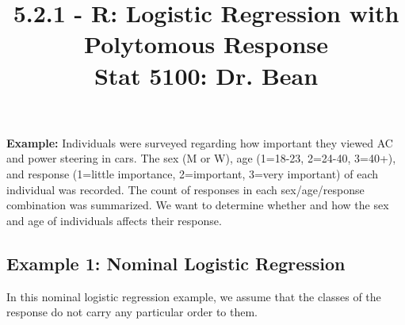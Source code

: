 \documentclass{article}\usepackage[]{graphicx}\usepackage[]{color}
\begin{document}
\title{%
  5.2.1 - R: Logistic Regression with Polytomous Response \\
  \smallskip
  \large Stat 5100: Dr. Bean
}
\date{}

\maketitle

\textbf{Example:} Individuals were surveyed regarding how important they viewed AC and power
steering in cars. The sex (M or W), age (1=18-23, 2=24-40, 3=40+), and response (1=little
importance, 2=important, 3=very important) of each individual was recorded. The count of
responses in each sex/age/response combination was summarized. We want to determine
whether and how the sex and age of individuals affects their response.

\subsection*{Example 1: Nominal Logistic Regression}

In this nominal logistic regression example, we assume that the classes of the response do not carry any particular order to them.
\end{document}

